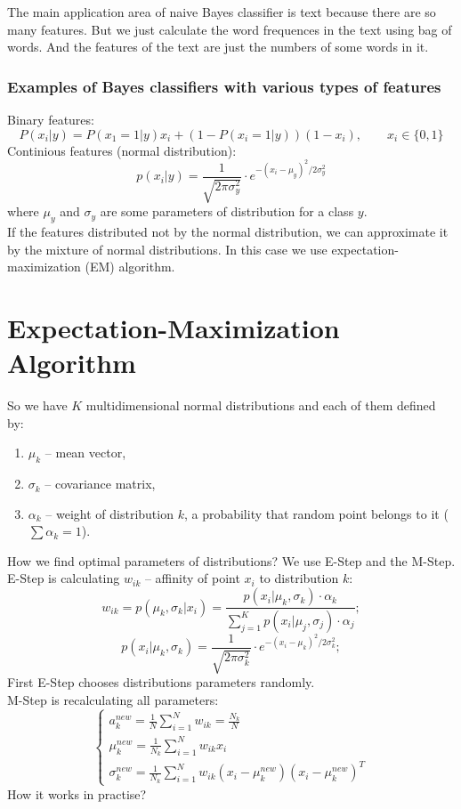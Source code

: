 The main application area of naive Bayes classifier is text because there are so many features. But we just calculate the word frequences in the text using bag of words. And the features of the text are just the numbers of some words in it.

\subsubsection*{Examples of Bayes classifiers with various types of features}

Binary features:
$$P(x_i|y)=P(x_1=1|y)x_i+(1-P(x_i=1|y))(1-x_i),\qquad x_i\in\{0,1\}$$
Continious features (normal distribution):
$$p(x_i|y)=\frac{1}{\sqrt{2\pi\sigma_y^2}}\cdot e^{-(x_i-\mu_y)^2/2\sigma_y^2}$$
where $\mu_y$ and $\sigma_y$ are some parameters of distribution for a class $y$. \\
If the features distributed not by the normal distribution, we can approximate it by the mixture of normal distributions. In this case we use expectation-maximization (EM) algorithm.

\section{Expectation-Maximization Algorithm}

So we have $K$ multidimensional normal distributions and each of them defined by:
\begin{enumerate}[label=$\bullet$]
	\item $\mu_k$ -- mean vector,
	\item $\sigma_k$ -- covariance matrix,
	\item $\alpha_k$ -- weight of distribution $k$, a probability that random point belongs to it ($\sum\alpha_k=1$).
\end{enumerate}
How we find optimal parameters of distributions? We use E-Step and the M-Step. E-Step is calculating $w_{ik}$ -- affinity of point $x_i$ to distribution $k$:
$$w_{ik} = p(\mu_k,\sigma_k|x_i)=\frac{p(x_i|\mu_k,\sigma_k)\cdot\alpha_k}{\sum\limits_{j=1}^{K}p(x_i|\mu_j,\sigma_j)\cdot\alpha_j};$$
$$p(x_i|\mu_k, \sigma_k)=\frac{1}{\sqrt{2\pi\sigma_k^2}}\cdot e^{-(x_i-\mu_k)^2/2\sigma_k^2};$$
First E-Step chooses distributions parameters randomly.\\
M-Step is recalculating all parameters:
$$\begin{cases}
	a_k^{new}=\frac{1}{N}\sum\limits_{i=1}^{N}w_{ik}=\frac{N_k}{N} \\
	\mu_k^{new}=\frac{1}{N_k}\sum\limits_{i=1}^{N}w_{ik}x_i \\
	\sigma_k^{new}=\frac{1}{N_k}\sum\limits_{i=1}^{N}w_{ik}(x_i-\mu_k^{new})(x_i-\mu_k^{new})^T
\end{cases}$$
How it works in practise?

